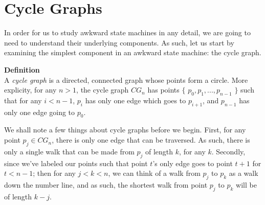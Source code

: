 \documentclass[a4paper,12pt]{article}
\begin{document}
\section{Cycle Graphs}
In order for us to study awkward state machines in any detail, we are going to need to understand their underlying components. As such, let us start by examining the simplest component in an awkward state machine: the cycle graph.
\\
\begin{tcolorbox}
\textbf{Definition}\\
A \textit{cycle graph} is a directed, connected graph whose points form a circle. More explicity, for any $n > 1$, the cycle graph $CG_n$ has points $\{$ $p_0, p_1, ..., p_{n-1}$ $\}$ such that for any $i < n - 1$, $p_i$ has only one edge which goes to $p_{i + 1}$, and $p_{n-1}$ has only one edge going to $p_0$.
\end{tcolorbox}
\noindent
We shall note a few things about cycle graphs before we begin. First, for any point $p_j \in CG_n$, there is only one edge that can be traversed. As such, there is only a single walk that can be made from $p_j$ of length $k$, for any $k$. Secondly, since we've labeled our points such that point $t$'s only edge goes to point $t + 1$ for $t < n - 1$; then for any $j < k < n$, we can think of a walk from $p_j$ to $p_k$ as a walk down the number line, and as such, the shortest walk from point $p_j$ to $p_k$ will be of length $k - j$.\\
\end{document}
